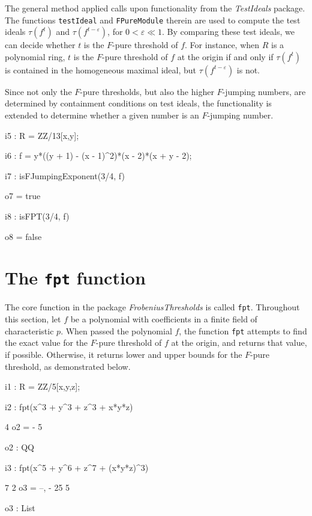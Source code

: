 \documentclass{amsart}
\begin{document}
The general method applied calls upon functionality from the \emph{TestIdeals} package.
The functions \texttt{testIdeal} and \texttt{FPureModule} therein are used to compute the test ideals $\tau(f^t)$ and $\tau(f^{t-\varepsilon})$, for $0<\varepsilon\ll 1$.
By comparing these test ideals, we can decide whether $t$ is the $F$-pure threshold of $f$.
For instance, when $R$ is a polynomial ring, $t$ is the $F$-pure threshold of $f$ at the origin if and only if $\tau(f^t)$ is contained in the homogeneous maximal ideal, but $\tau(f^{t-\varepsilon})$ is not.

Since not only the $F$-pure thresholds, but also the higher $F$-jumping numbers, are determined by containment conditions on test ideals, the functionality is extended to determine whether a given number is an $F$-jumping number.

\smallskip
{\small
{}
\begin{MyVerbatim}
i5 : R = ZZ/13[x,y];

i6 : f = y*((y + 1) - (x - 1)^2)*(x - 2)*(x + y - 2);

i7 : isFJumpingExponent(3/4, f)

o7 = true

i8 : isFPT(3/4, f)

o8 = false
\end{MyVerbatim}
}


\section{The {\tt fpt} function}
\label{sec.FPT}

The core function in the package \emph{FrobeniusThresholds} is called \texttt{fpt}.  Throughout this section, let $f$ be a polynomial with coefficients in a finite field of characteristic $p$. When passed the polynomial $f$, the function \texttt{fpt} attempts to find the exact value for the $F$-pure threshold of $f$ at the origin, and returns that value, if possible.  Otherwise, it returns lower and upper bounds for the $F$-pure threshold, as demonstrated below.

\smallskip
{\small
{}
\begin{MyVerbatim}
i1 : R = ZZ/5[x,y,z];

i2 : fpt(x^3 + y^3 + z^3 + x*y*z)

     4
o2 = -
     5

o2 : QQ

i3 : fpt(x^5 + y^6 + z^7 + (x*y*z)^3)

       7  2
o3 = {--, -}
      25  5

o3 : List
\end{MyVerbatim}
}
\end{document}
